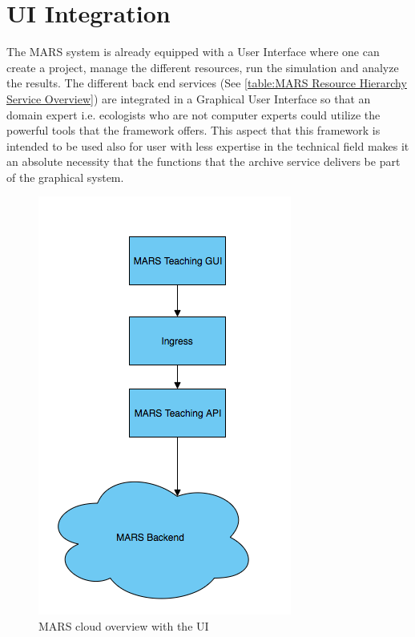 \section{UI Integration}
The MARS system is already equipped with a User Interface where one can create a project, manage the different resources, run the simulation and
analyze the results. The different back end services (See \ref{table:MARS Resource Hierarchy Service Overview}) are integrated in a Graphical
User Interface so that an domain expert i.e. ecologists who are not computer experts could utilize the powerful tools that the framework offers.
This aspect that this framework is intended to be used also for user with less expertise in the technical field makes it an absolute necessity that
the functions that the archive service delivers be part of the graphical system.

\begin{figure}[H]
    \centering \includegraphics[scale=0.6]{grafiken/marsIngress.png}
    \caption{MARS cloud overview with the UI}
    \label{fig:marsCloudUI}
\end{figure}

